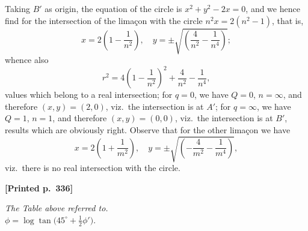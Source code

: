 \documentclass[11pt]{article}
\begin{document}
Taking $B'$ as origin, the equation of the circle is $x^{2}+y^{2}-2x=0$, and we hence find for the intersection of the lima\c{c}on with the circle $n^{2}x = 2(n^{2}-1)$, that is,
\[
x = 2\left(1-\frac{1}{n^{2}}\right),\quad y = \pm\sqrt{\left(\frac{4}{n^{2}}-\frac{1}{n^{4}}\right)};
\]
whence also
\[
r^{2} = 4\left(1-\frac{1}{n^{2}}\right)^{2} + \frac{4}{n^{2}} - \frac{1}{n^{4}},
\]
values which belong to a real intersection; for $q=0$, we have $Q=0$, $n=\infty$, and therefore $(x,y)=(2,0)$, viz.\ the intersection is at $A'$; for $q=\infty$, we have $Q=1$, $n=1$, and therefore $(x,y)=(0,0)$, viz.\ the intersection is at $B'$, results which are obviously right. Observe that for the other lima\c{c}on we have
\[
x = 2\left(1+\frac{1}{m^{2}}\right),\quad y = \pm\sqrt{\left(-\frac{4}{m^{2}} - \frac{1}{m^{4}}\right)},
\]
viz.\ there is no real intersection with the circle.

\medskip

\noindent\textbf{[Printed p.~336]}\hfill

\begin{center}
\textit{The Table above referred to.}\\[2pt]
$\phi = \log\tan\bigl(45^{\circ}+\tfrac{1}{2}\phi'\bigr)$.
\end{center}
\end{document}
